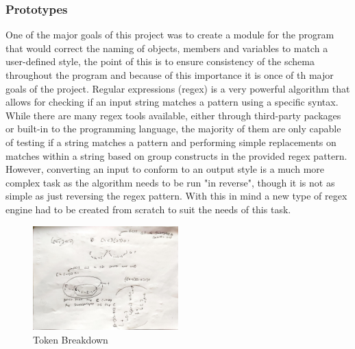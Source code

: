 \subsubsection{Prototypes}

One of the major goals of this project was to create a module for the program that would correct the naming of objects, members and variables to match a user-defined style, the point of this is to ensure consistency of the schema throughout the program and because of this importance it is once of th major goals of the project. Regular expressions (regex) is a very powerful algorithm that allows for checking if an input string matches a pattern using a specific syntax. While there are many regex tools available, either through third-party packages or built-in to the programming language, the majority of them are only capable of testing if a string matches a pattern and performing simple replacements on matches within a string based on group constructs in the provided regex pattern. However, converting an input to conform to an output style is a much more complex task as the algorithm needs to be run "in reverse", though it is not as simple as just reversing the regex pattern. With this in mind a new type of regex engine had to be created from scratch to suit the needs of this task.

\begin{figure}
    \vspace{-10px}
    \centering
    \caption{Token Breakdown}
    \label{fig:TokenBreakdown}
    \includegraphics[angle=90,width=0.5\textwidth]{Figures/TokenBreakdown.jpg}
\end{figure}

